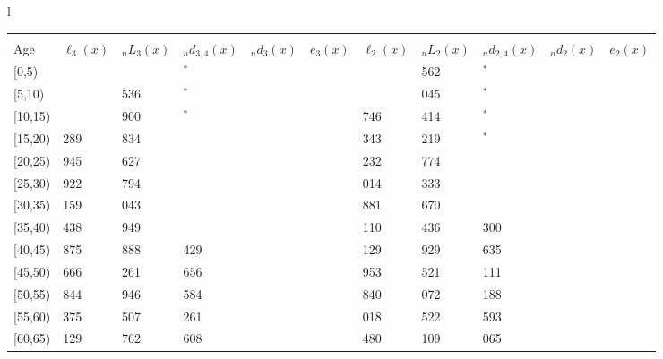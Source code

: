 \documentclass[
]{article}
\begin{document}
\begin{table}
\begin{tabular}[t]{l}
\end{tabular}
\centering
\begin{tabular}[t]{l}
\hline
\begin{tabular}{>{\raggedright\arraybackslash}p{.43in}>{\raggedleft\arraybackslash}p{.42in}>{\raggedleft\arraybackslash}p{.42in}>{\raggedleft\arraybackslash}p{.42in}>{\raggedleft\arraybackslash}p{.42in}>{\raggedleft\arraybackslash}p{.42in}>{\raggedleft\arraybackslash}p{.42in}>{\raggedleft\arraybackslash}p{.42in}>{\raggedleft\arraybackslash}p{.42in}>{\raggedleft\arraybackslash}p{.42in}>{\raggedleft\arraybackslash}p{.42in}}
\toprule
\multicolumn{1}{c}{ } & \multicolumn{5}{c}{(2) Lost mother only} & \multicolumn{5}{c}{(3) Lost father only} \\
\cmidrule(l{3pt}r{3pt}){2-6} \cmidrule(l{3pt}r{3pt}){7-11}
Age & $\ell_{3}(x)$ & ${}_nL_{3}(x)$ & ${}_nd_{3,4}(x)$ & ${}_nd_{3}(x)$ & $e_{3}(x)$ & $\ell_{2}(x)$ & ${}_nL_{2}(x)$ & ${}_nd_{2,4}(x)$ & ${}_nd_{2}(x)$ & $e_{2}(x)$\\
\midrule
{}[0,5) & 0 & 605 & 4$^{*}$ & 1 & 3 & 0 & 1 562 & 0$^{*}$ & 1 & 11\\
{}[5,10) & 345 & 2 536 & 28$^{*}$ & 0 & 3 & 797 & 6 045 & 27$^{*}$ & 0 & 11\\
{}[10,15) & 811 & 4 900 & 16$^{*}$ & 1 & 3 & 1 746 & 12 414 & 22$^{*}$ & 1 & 11\\
{}[15,20) & 1 289 & 7 834 & 165 & 2 & 3 & 3 343 & 21 219 & 54$^{*}$ & 6 & 11\\
{}[20,25) & 1 945 & 12 627 & 192 & 7 & 3 & 5 232 & 33 774 & 150 & 18 & 11\\
\addlinespace
{}[25,30) & 2 922 & 17 794 & 283 & 15 & 3 & 8 014 & 49 333 & 327 & 41 & 10\\
{}[30,35) & 4 159 & 25 043 & 594 & 29 & 3 & 10 881 & 67 670 & 867 & 77 & 10\\
{}[35,40) & 5 438 & 30 949 & 853 & 48 & 3 & 14 110 & 89 436 & 1 300 & 137 & 9\\
{}[40,45) & 6 875 & 39 888 & 1 429 & 79 & 3 & 18 129 & 112 929 & 2 635 & 223 & 8\\
{}[45,50) & 8 666 & 46 261 & 2 656 & 130 & 2 & 21 953 & 134 521 & 4 111 & 379 & 7\\
\addlinespace
{}[50,55) & 8 844 & 45 946 & 3 584 & 188 & 2 & 24 840 & 147 072 & 7 188 & 600 & 6\\
{}[55,60) & 8 375 & 41 507 & 4 261 & 252 & 1 & 25 018 & 143 522 & 9 593 & 873 & 5\\
{}[60,65) & 7 129 & 31 762 & 4 608 & 281 & 1 & 21 480 & 112 109 & 12 065 & 991 & 3\\

\end{tabular}
\end{tabular}
\end{table}
\end{document}
